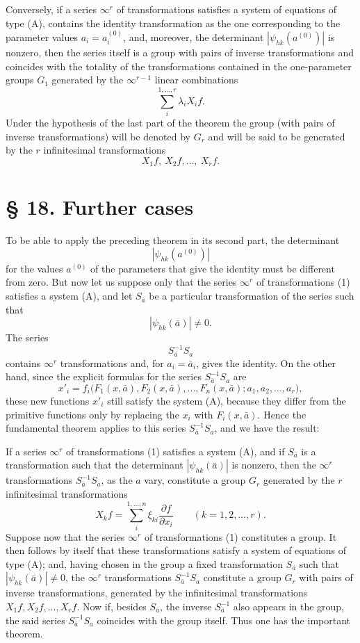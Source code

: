 \documentclass[11pt]{book}
\begin{document}
Conversely, if a series $\infty^r$ of transformations satisfies a system of equations of type (A), contains the identity transformation as the one corresponding to the parameter values $a_i=a_i^{(0)}$, and, moreover, the determinant $|\psi_{hk}(a^{(0)})|$ is nonzero, then the series itself is a group with pairs of inverse transformations and coincides with the totality of the transformations contained in the one-parameter groups $G_1$ generated by the $\infty^{r-1}$ linear combinations
\[
 \sum\limits_i^{1,\ldots,r} \lambda_i X_i f.
\]
Under the hypothesis of the last part of the theorem the group (with pairs of inverse transformations) will be denoted by $G_r$ and will be said to be generated by the $r$ infinitesimal transformations
\[
 X_1f,\ X_2f,\ldots,\ X_rf.
\]

\section*{\S{} 18. Further cases}

To be able to apply the preceding theorem in its second part, the determinant
\[
 |\psi_{hk}(a^{(0)})|
\]
for the values $a^{(0)}$ of the parameters that give the identity must be different from zero. But now let us suppose only that the series $\infty^r$ of transformations (1) satisfies a system (A), and let $S_{\bar a}$ be a particular transformation of the series such that
\[
 |\psi_{hk}(\bar a)|\ne0.
\]
The series
\[
 S_{\bar a}^{-1}S_a
\]
contains $\infty^r$ transformations and, for $a_i=\bar a_i$, gives the identity. On the other hand, since the explicit formulas for the series $S_{\bar a}^{-1}S_a$ are
\[
 x'_i=f_i\bigl(F_1(x,\bar a),F_2(x,\bar a),\ldots,F_n(x,\bar a); a_1,a_2,\ldots,a_r\bigr),
\]
these new functions $x'_i$ still satisfy the system (A), because they differ from the primitive functions only by replacing the $x_i$ with $F_i(x,\bar a)$. Hence the fundamental theorem applies to this series $S_{\bar a}^{-1}S_a$, and we have the result:

If a series $\infty^r$ of transformations (1) satisfies a system (A), and if $S_{\bar a}$ is a transformation such that the determinant $|\psi_{hk}(\bar a)|$ is nonzero, then the $\infty^r$ transformations $S_{\bar a}^{-1}S_a$, as the $a$ vary, constitute a group $G_r$ generated by the $r$ infinitesimal transformations
\[
 X_kf=\sum\limits_i^{1,\ldots,n} \xi_{ki}\frac{\partial f}{\partial x_i}\qquad (k=1,2,\ldots,r).
\]
Suppose now that the series $\infty^r$ of transformations (1) constitutes a group. It then follows by itself that these transformations satisfy a system of equations of type (A); and, having chosen in the group a fixed transformation $S_{\bar a}$ such that $|\psi_{hk}(\bar a)|\ne0$, the $\infty^r$ transformations $S_{\bar a}^{-1}S_a$ constitute a group $G_r$ with pairs of inverse transformations, generated by the infinitesimal transformations $X_1f,X_2f,\ldots,X_rf$. Now if, besides $S_{\bar a}$, the inverse $S_{\bar a}^{-1}$ also appears in the group, the said series $S_{\bar a}^{-1}S_a$ coincides with the group itself. Thus one has the important theorem.
\end{document}
